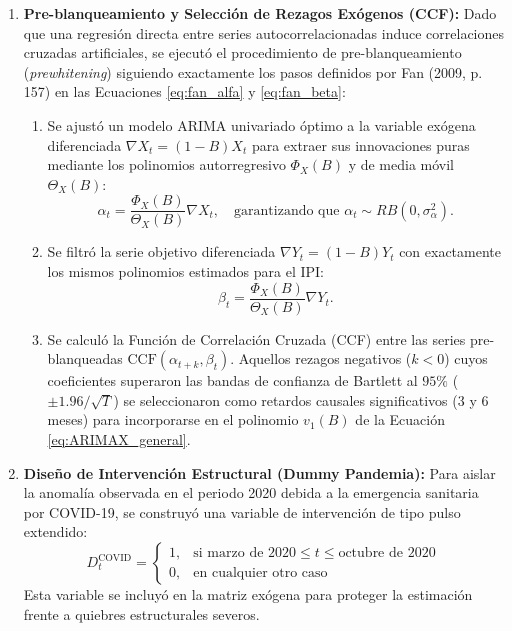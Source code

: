 \documentclass[11pt,letterpaper]{article}
\begin{document}
\begin{enumerate}
    \item \textbf{Pre-blanqueamiento y Selección de Rezagos Exógenos (CCF):}
    Dado que una regresión directa entre series autocorrelacionadas induce correlaciones cruzadas artificiales, se ejecutó el procedimiento de pre-blanqueamiento (\textit{prewhitening}) siguiendo exactamente los pasos definidos por Fan (2009, p. 157) en las Ecuaciones \ref{eq:fan_alfa} y \ref{eq:fan_beta}:
    \begin{enumerate}
        \item[a.] Se ajustó un modelo ARIMA univariado óptimo a la variable exógena diferenciada $\nabla X_t = (1-B)X_t$ para extraer sus innovaciones puras mediante los polinomios autorregresivo $\Phi_X(B)$ y de media móvil $\Theta_X(B)$:
        \[
        \alpha_t = \frac{\Phi_X(B)}{\Theta_X(B)} \nabla X_t, \quad \text{garantizando que } \alpha_t \sim RB(0, \sigma_\alpha^2).
        \]
        \item[b.] Se filtró la serie objetivo diferenciada $\nabla Y_t = (1-B)Y_t$ con exactamente los mismos polinomios estimados para el IPI:
        \[
        \beta_t = \frac{\Phi_X(B)}{\Theta_X(B)} \nabla Y_t.
        \]
        \item[c.] Se calculó la Función de Correlación Cruzada (CCF) entre las series pre-blanqueadas $\text{CCF}(\alpha_{t+k}, \beta_t)$. Aquellos rezagos negativos ($k < 0$) cuyos coeficientes superaron las bandas de confianza de Bartlett al $95\%$ ($\pm 1.96/\sqrt{T}$) se seleccionaron como retardos causales significativos (3 y 6 meses) para incorporarse en el polinomio $v_1(B)$ de la Ecuación \ref{eq:ARIMAX_general}.
    \end{enumerate}

    \item \textbf{Diseño de Intervención Estructural (Dummy Pandemia):}
    Para aislar la anomalía observada en el periodo 2020 debida a la emergencia sanitaria por COVID-19, se construyó una variable de intervención de tipo pulso extendido:
    \begin{equation}
        D_{t}^{\text{COVID}} = \begin{cases} 
        1, & \text{si marzo de 2020} \le t \le \text{octubre de 2020} \\ 
        0, & \text{en cualquier otro caso} 
        \end{cases}
        \label{eq:dummy_covid}
    \end{equation}
    Esta variable se incluyó en la matriz exógena para proteger la estimación frente a quiebres estructurales severos.


\end{enumerate}
\end{document}
